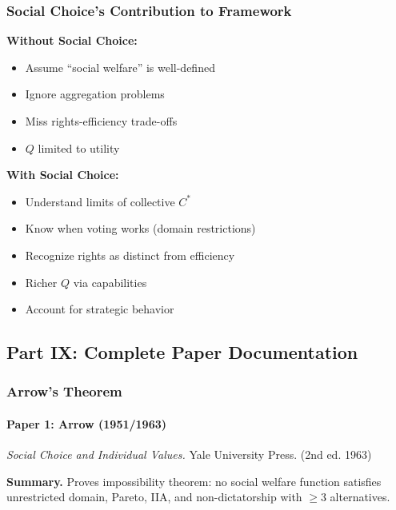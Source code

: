 \subsubsection{Social Choice's Contribution to Framework}

\textbf{Without Social Choice:}
\begin{itemize}
    \item Assume ``social welfare'' is well-defined
    \item Ignore aggregation problems
    \item Miss rights-efficiency trade-offs
    \item $Q$ limited to utility
\end{itemize}

\textbf{With Social Choice:}
\begin{itemize}
    \item Understand limits of collective $C^*$
    \item Know when voting works (domain restrictions)
    \item Recognize rights as distinct from efficiency
    \item Richer $Q$ via capabilities
    \item Account for strategic behavior
\end{itemize}

\subsection{Part IX: Complete Paper Documentation}

\subsubsection{Arrow's Theorem}

\paragraph{Paper 1: Arrow (1951/1963)}

\textit{Social Choice and Individual Values.}
Yale University Press. (2nd ed. 1963)

\textbf{Summary.}
Proves impossibility theorem: no social welfare function satisfies unrestricted 
domain, Pareto, IIA, and non-dictatorship with $\geq 3$ alternatives.

